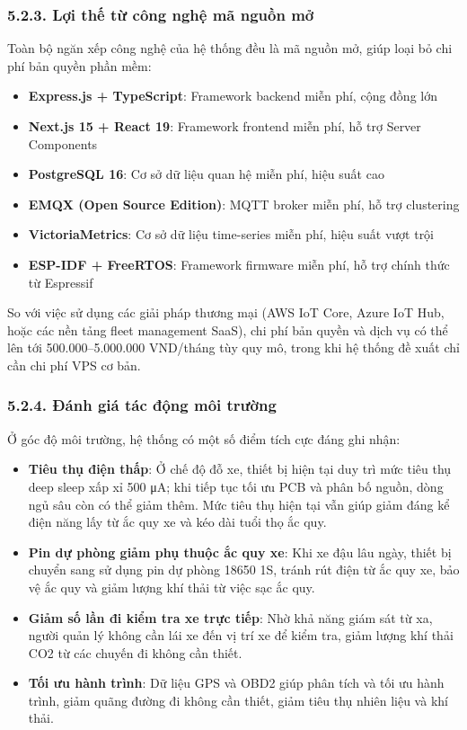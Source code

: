 \documentclass[13pt,a4paper]{extarticle}
\renewcommand{\\}{\thesislongtableorignewline\hline}%
\providecommand{\tightlist}{%
  \setlength{\itemsep}{0pt}\setlength{\parskip}{0pt}}
\begin{document}
\subsubsection{5.2.3. Lợi thế từ công nghệ mã nguồn
mở}\label{523-lux1ee3i-thux1ebf-tux1eeb-cuxf4ng-nghux1ec7-muxe3-nguux1ed3n-mux1edf}

Toàn bộ ngăn xếp công nghệ của hệ thống đều là mã nguồn mở, giúp loại bỏ
chi phí bản quyền phần mềm:

\begin{itemize}
\tightlist
\item
  \textbf{Express.js + TypeScript}: Framework backend miễn phí, cộng
  đồng lớn
\item
  \textbf{Next.js 15 + React 19}: Framework frontend miễn phí, hỗ trợ
  Server Components
\item
  \textbf{PostgreSQL 16}: Cơ sở dữ liệu quan hệ miễn phí, hiệu suất cao
\item
  \textbf{EMQX (Open Source Edition)}: MQTT broker miễn phí, hỗ trợ
  clustering
\item
  \textbf{VictoriaMetrics}: Cơ sở dữ liệu time-series miễn phí, hiệu
  suất vượt trội
\item
  \textbf{ESP-IDF + FreeRTOS}: Framework firmware miễn phí, hỗ trợ chính
  thức từ Espressif
\end{itemize}

So với việc sử dụng các giải pháp thương mại (AWS IoT Core, Azure IoT
Hub, hoặc các nền tảng fleet management SaaS), chi phí bản quyền và dịch
vụ có thể lên tới 500.000--5.000.000 VND/tháng tùy quy mô, trong khi hệ
thống đề xuất chỉ cần chi phí VPS cơ bản.

\subsubsection{5.2.4. Đánh giá tác động môi
trường}\label{524-ux111uxe1nh-giuxe1-tuxe1c-ux111ux1ed9ng-muxf4i-trux1b0ux1eddng}

Ở góc độ môi trường, hệ thống có một số điểm tích cực đáng ghi nhận:

\begin{itemize}
\tightlist
\item
  \textbf{Tiêu thụ điện thấp}: Ở chế độ đỗ xe, thiết bị hiện tại duy trì
  mức tiêu thụ deep sleep xấp xỉ 500 μA; khi tiếp tục tối ưu PCB và phân
  bố nguồn, dòng ngủ sâu còn có thể giảm thêm. Mức tiêu thụ hiện tại vẫn
  giúp giảm đáng kể điện năng lấy từ ắc quy xe và kéo dài tuổi thọ ắc
  quy.
\item
  \textbf{Pin dự phòng giảm phụ thuộc ắc quy xe}: Khi xe đậu lâu ngày,
  thiết bị chuyển sang sử dụng pin dự phòng 18650 1S, tránh rút điện từ
  ắc quy xe, bảo vệ ắc quy và giảm lượng khí thải từ việc sạc ắc quy.
\item
  \textbf{Giảm số lần đi kiểm tra xe trực tiếp}: Nhờ khả năng giám sát
  từ xa, người quản lý không cần lái xe đến vị trí xe để kiểm tra, giảm
  lượng khí thải CO2 từ các chuyến đi không cần thiết.
\item
  \textbf{Tối ưu hành trình}: Dữ liệu GPS và OBD2 giúp phân tích và tối
  ưu hành trình, giảm quãng đường đi không cần thiết, giảm tiêu thụ
  nhiên liệu và khí thải.
\end{itemize}
\end{document}
